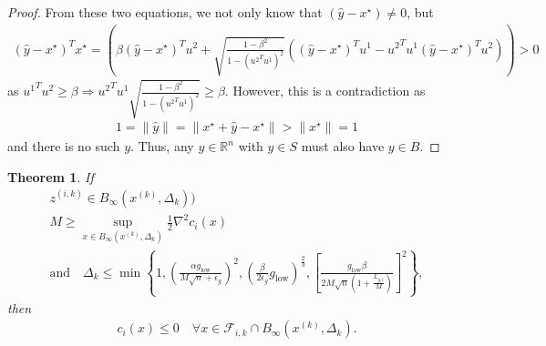\documentclass{article}
\newtheorem{theorem}{Theorem}[section]
\theoremstyle{case}
\newcommand{\dk}{\Delta_k}
\newcommand{\xk}{{x^{(k)}}}
\newcommand{\fik}{{\mathcal F_{i, k}}}
\newcommand{\rn}{{\mathbb R^{n}}}
\newcommand{\lgi}{{L_{g, i}}}
\begin{document}
\begin{proof}
From these two equations, we not only know that $\left(\hat y - x^{\star}\right) \ne 0$, but
\begin{align*}
{\left(\hat y - x^{\star}\right)}^Tx^{\star} = 
\left(\beta {\left(\hat y - x^{\star}\right)}^Tu^2 + \sqrt{\frac{1 - \beta^2}{1 - ({u^2}^Tu^1)^2}} \left({\left(\hat y - x^{\star}\right)}^Tu^1 - {u^2}^Tu^1 {\left(\hat y - x^{\star}\right)}^Tu^2 \right)\right) > 0
\end{align*}
as ${u^1}^Tu^2 \ge \beta \Longrightarrow {u^2}^Tu^1\sqrt{\frac{1 - \beta^2}{1 - ({u^2}^Tu^1)^2}} \ge \beta$.
However, this is a contradiction as
\begin{align*}
1 = \|\hat y\| = \|x^{\star} + \hat y - x^{\star}\| > \|x^{\star}\| = 1
\end{align*}
and there is no such $y$.
Thus, any $y \in\rn$ with $y \in S$ must also have $y \in B$.
\end{proof}






\begin{theorem}
If 
\begin{align}
z^{(i, k)} \in B_{\infty}(\xk, \dk)) \label{z_is_active} \\
M \ge \sup_{x \in B_{\infty}(\xk, \dk)} \frac 1 2 \nabla^2 c_i(x) \label{m_bounds} \\
\text{and} \quad \dk \le \min\left\{
1,
\left(\frac{\alpha g_{\text{low}}}{M \sqrt{n} + \epsilon_g}\right)^2,
\left(\frac{\beta}{2\epsilon_{g}}g_{\text{low}}\right)^{\frac 2 3},
\left[\frac {g_{\text{low}} \beta} {2M\sqrt{n}\left(1 + \frac {\lgi} M \right)} \right]^2
\right\}, \label{delta_is_small_enough}
\end{align} then
\begin{align*}
c_i(x) \le 0 \quad \forall x \in \fik \cap B_{\infty}(\xk, \dk).
\end{align*}

\end{theorem}
\end{document}
